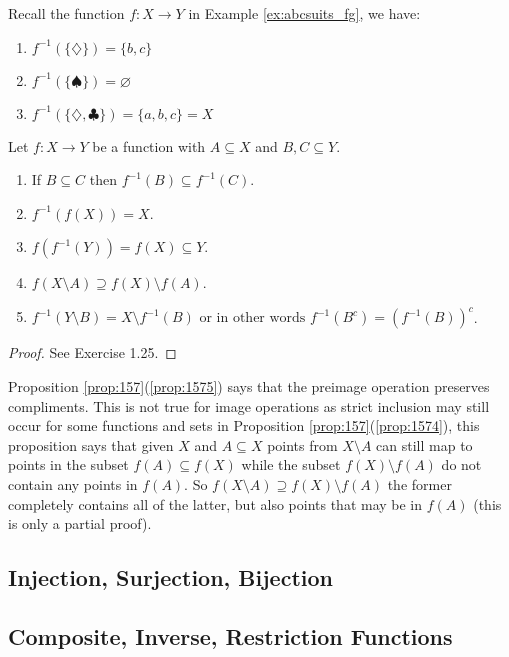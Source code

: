 \begin{example}
    Recall the function $f:X\to Y$ in Example \ref{ex:abcsuits_fg}, we have:
    \begin{enumerate}
        \item $f^{-1}(\{\diamondsuit\}) = \{b,c\}$
        \item $f^{-1}(\{\spadesuit\}) = \varnothing$
        \item $f^{-1}(\{\diamondsuit,\clubsuit\}) = \{a,b,c\} = X$
    \end{enumerate}
\end{example}

\begin{proposition} Let $f : X \to Y$ be a function with $A \subseteq X$ and $B,C \subseteq Y$.
    \label{prop:157}
    \begin{enumerate}
        \item If $B \subseteq C$ then $f^{-1}(B) \subseteq f^{-1}(C)$. \label{prop:1571}
        \item $f^{-1}(f(X)) = X$. \label{prop:1572}
        \item $f(f^{-1}(Y)) = f(X) \subseteq Y$. \label{prop:1573}
        \item $f(X \setminus A) \supseteq f(X) \setminus f(A)$. \label{prop:1574}
        \item $f^{-1}(Y \setminus B) = X \setminus f^{-1}(B) \text{ or in other words } f^{-1}(B^c)= (f^{-1}(B))^c$. \label{prop:1575}
    \end{enumerate}
\end{proposition}

\begin{proof}
    See Exercise 1.25.
\end{proof}

Proposition \ref{prop:157}(\ref{prop:1575}) says that the preimage operation preserves compliments. This is not true for image operations as strict inclusion may still occur for some functions and sets in Proposition \ref{prop:157}(\ref{prop:1574}), this proposition says that given $X$ and $A \subseteq X$ points from $X \setminus A$ can still map to points in the subset $f(A) \subseteq f(X)$ while the subset $f(X) \setminus f(A)$ do not contain any points in $f(A)$. So $f(X \setminus A) \supseteq f(X)\setminus f(A)$ the former completely contains all of the latter, but also points that may be in $f(A)$ (this is only a partial proof).


\subsection{Injection, Surjection, Bijection}

\subsection{Composite, Inverse, Restriction Functions}
